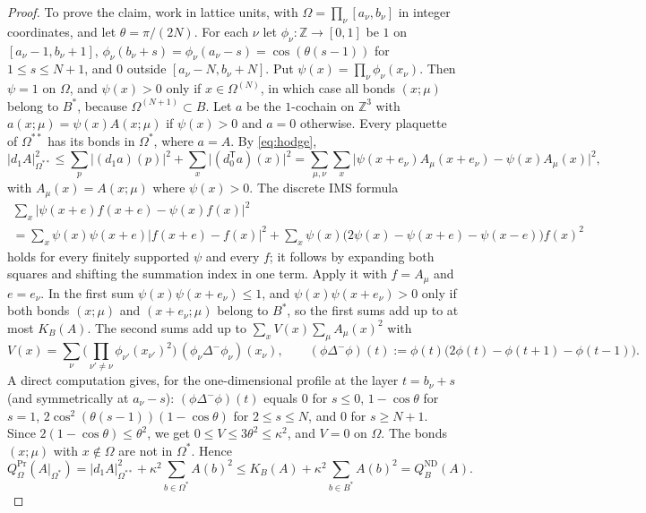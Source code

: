 \documentclass[11pt]{amsart}
\theoremstyle{plain}
\theoremstyle{definition}
\theoremstyle{remark}
\numberwithin{equation}{section}
\newcommand{\Z}{\mathbb{Z}}
\newcommand{\abs}[1]{\lvert #1\rvert}
\begin{document}
\begin{proof}
To prove the claim, work in lattice units, with $\Omega=\prod_\nu[a_\nu,b_\nu]$ in integer coordinates, and let $\theta=\pi/(2N)$. For each $\nu$ let $\phi_\nu:\Z\to[0,1]$ be $1$ on $[a_\nu-1,b_\nu+1]$, $\phi_\nu(b_\nu+s)=\phi_\nu(a_\nu-s)=\cos(\theta(s-1))$ for $1\le s\le N+1$, and $0$ outside $[a_\nu-N,b_\nu+N]$. Put $\psi(x)=\prod_\nu\phi_\nu(x_\nu)$. Then $\psi=1$ on $\Omega$, and $\psi(x)>0$ only if $x\in\Omega^{(N)}$, in which case all bonds $(x;\mu)$ belong to $B^*$, because $\Omega^{(N+1)}\subset B$. Let $a$ be the $1$-cochain on $\Z^3$ with $a(x;\mu)=\psi(x)A(x;\mu)$ if $\psi(x)>0$ and $a=0$ otherwise. Every plaquette of $\Omega^{**}$ has its bonds in $\Omega^*$, where $a=A$. By \eqref{eq:hodge},
\[
\abs{d_1A}^2_{\Omega^{**}}\le\sum_p\abs{(d_1a)(p)}^2+\sum_x\abs{(d_0^{\mathsf T}a)(x)}^2=\sum_{\mu,\nu}\sum_x\abs{\psi(x+e_\nu)A_\mu(x+e_\nu)-\psi(x)A_\mu(x)}^2 ,
\]
with $A_\mu(x)=A(x;\mu)$ where $\psi(x)>0$. The discrete IMS formula
\begin{multline*}
\sum_x\abs{\psi(x+e)f(x+e)-\psi(x)f(x)}^2\\=\sum_x\psi(x)\psi(x+e)\abs{f(x+e)-f(x)}^2+\sum_x\psi(x)\big(2\psi(x)-\psi(x+e)-\psi(x-e)\big)f(x)^2
\end{multline*}
holds for every finitely supported $\psi$ and every $f$; it follows by expanding both squares and shifting the summation index in one term. Apply it with $f=A_\mu$ and $e=e_\nu$. In the first sum $\psi(x)\psi(x+e_\nu)\le1$, and $\psi(x)\psi(x+e_\nu)>0$ only if both bonds $(x;\mu)$ and $(x+e_\nu;\mu)$ belong to $B^*$, so the first sums add up to at most $K_B(A)$. The second sums add up to $\sum_xV(x)\sum_\mu A_\mu(x)^2$ with
\[
V(x)=\sum_\nu\Big(\prod_{\nu'\ne\nu}\phi_{\nu'}(x_{\nu'})^2\Big)\,(\phi_\nu\Delta^-\phi_\nu)(x_\nu),\qquad(\phi\Delta^-\phi)(t):=\phi(t)\big(2\phi(t)-\phi(t+1)-\phi(t-1)\big).
\]
A direct computation gives, for the one-dimensional profile at the layer $t=b_\nu+s$ (and symmetrically at $a_\nu-s$): $(\phi\Delta^-\phi)(t)$ equals $0$ for $s\le0$, $1-\cos\theta$ for $s=1$, $2\cos^2(\theta(s-1))(1-\cos\theta)$ for $2\le s\le N$, and $0$ for $s\ge N+1$. Since $2(1-\cos\theta)\le\theta^2$, we get $0\le V\le3\theta^2\le\kappa^2$, and $V=0$ on $\Omega$. The bonds $(x;\mu)$ with $x\notin\Omega$ are not in $\Omega^*$. Hence
\[
Q^{\mathrm{Pr}}_\Omega(A|_{\Omega^*})=\abs{d_1A}^2_{\Omega^{**}}+\kappa^2\sum_{b\in\Omega^*}A(b)^2\le K_B(A)+\kappa^2\sum_{b\in B^*}A(b)^2=Q^{\mathrm{ND}}_B(A).
\]


\end{proof}
\end{document}
